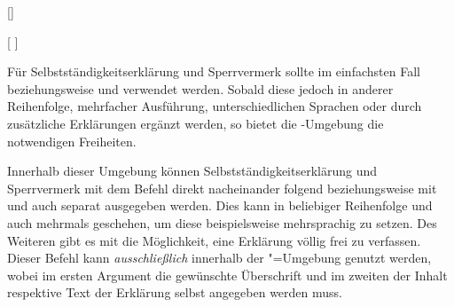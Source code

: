 \begin{Declaration*}{}
\begin{Declaration*}{}
\begin{Declaration*}{}
\begin{Declaration}{[]}
\begin{Declaration}{%
  [%
  ]%
}
\begin{Declaration}{}
\begin{Declaration}{}
\begin{Declaration}{%
}
\begin{Declaration}{%
}
\begin{Declaration}{}
\begin{Declaration}{%
}
\begin{Declaration}{}
\begin{Declaration}{}
\begin{Declaration}{}
\printdeclarationlist%
%
Für Selbstständigkeitserklärung und Sperrvermerk sollte im einfachsten Fall 
 beziehungsweise  und  
verwendet werden. Sobald diese jedoch in anderer Reihenfolge, mehrfacher 
Ausführung, unterschiedlichen Sprachen oder durch zusätzliche Erklärungen 
ergänzt werden, so bietet die -Umgebung die 
notwendigen Freiheiten.

Innerhalb dieser Umgebung können Selbstständigkeitserklärung und Sperrvermerk 
mit dem Befehl  direkt nacheinander folgend beziehungsweise 
mit  und  auch separat ausgegeben werden. 
Dies kann in beliebiger Reihenfolge und auch mehrmals geschehen, um diese 
beispielsweise mehrsprachig zu setzen.
 Des Weiteren gibt es mit  die 
Möglichkeit, eine Erklärung völlig frei zu verfassen. Dieser Befehl kann 
\emph{ausschließlich} innerhalb der "=Umgebung 
genutzt werden, wobei im ersten Argument die gewünschte Überschrift und im 
zweiten der Inhalt respektive Text der Erklärung selbst angegeben werden muss.


\end{Declaration}
\end{Declaration}
\end{Declaration}
\end{Declaration}
\end{Declaration}
\end{Declaration}
\end{Declaration}
\end{Declaration}
\end{Declaration}
\end{Declaration}
\end{Declaration}
\end{Declaration*}
\end{Declaration*}
\end{Declaration*}
